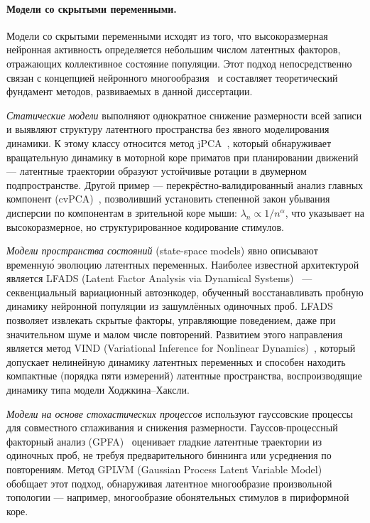 \paragraph{Модели со скрытыми переменными.}
Модели со скрытыми переменными исходят из того, что высокоразмерная нейронная активность определяется небольшим числом латентных факторов, отражающих коллективное состояние популяции. Этот подход непосредственно связан с концепцией нейронного многообразия~\cite{Gallego2017} и составляет теоретический фундамент методов, развиваемых в данной диссертации.

\textit{Статические модели} выполняют однократное снижение размерности всей записи и выявляют структуру латентного пространства без явного моделирования динамики. К этому классу относится метод jPCA~\cite{Churchland2012}, который обнаруживает вращательную динамику в моторной коре приматов при планировании движений --- латентные траектории образуют устойчивые ротации в двумерном подпространстве. Другой пример --- перекрёстно-валидированный анализ главных компонент (cvPCA)~\cite{Stringer2019}, позволивший установить степенной закон убывания дисперсии по компонентам в зрительной коре мыши: $\lambda_n \propto 1/n^\alpha$, что указывает на высокоразмерное, но структурированное кодирование стимулов.

\textit{Модели пространства состояний} (state-space models) явно описывают временну\'{ю} эволюцию латентных переменных. Наиболее известной архитектурой является LFADS (Latent Factor Analysis via Dynamical Systems)~\cite{Pandarinath2018} --- секвенциальный вариационный автоэнкодер, обученный восстанавливать пробную динамику нейронной популяции из зашумлённых одиночных проб. LFADS позволяет извлекать скрытые факторы, управляющие поведением, даже при значительном шуме и малом числе повторений. Развитием этого направления является метод VIND (Variational Inference for Nonlinear Dynamics)~\cite{ZhaoPark2017}, который допускает нелинейную динамику латентных переменных и способен находить компактные (порядка пяти измерений) латентные пространства, воспроизводящие динамику типа модели Ходжкина--Хаксли.

\textit{Модели на основе стохастических процессов} используют гауссовские процессы для совместного сглаживания и снижения размерности. Гауссов-процессный факторный анализ (GPFA)~\cite{Yu2009} оценивает гладкие латентные траектории из одиночных проб, не требуя предварительного биннинга или усреднения по повторениям. Метод GPLVM (Gaussian Process Latent Variable Model)~\cite{wu2018} обобщает этот подход, обнаруживая латентное многообразие произвольной топологии --- например, многообразие обонятельных стимулов в пириформной коре.


